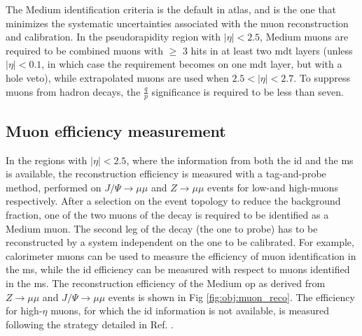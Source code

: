 The Medium identification criteria is the default in \gls{atlas}, and is the one that minimizes the systematic uncertainties associated with 
the muon reconstruction and calibration. In the pseudorapidity region with $|\eta|<2.5$, Medium muons are required to be combined muons with $\geq$ 3 hits in at least two \gls{mdt} layers (unless $|\eta|<0.1$, in which case the requirement becomes on one \gls{mdt} layer, but with a hole veto), while extrapolated muons are used when $2.5<|\eta|<2.7$. To suppress muons from hadron decays, the $\frac{q}{p}$ significance is required to be less than seven. 

\subsection{Muon efficiency measurement}

In the regions with $|\eta|<2.5$, where the information from both the \gls{id} and the \gls{ms} is available, 
the reconstruction efficiency is measured with a tag-and-probe method, performed on $J/\Psi \rightarrow \mu \mu$ and $Z\rightarrow \mu \mu$ events for low-\pt and high-\pt muons respectively. 
After a selection on the event topology to reduce the background fraction, one of the two muons of the decay is required to be identified 
as a Medium muon. The second leg of the decay (the one to probe) has to be reconstructed by a system independent on the one to be calibrated. For example, calorimeter muons can be used to measure the efficiency of muon identification in the \gls{ms}, while the \gls{id} efficiency can be measured with respect to muons identified in the \gls{ms}. 
The reconstruction efficiency of the Medium \gls{op} as derived from $Z\rightarrow \mu \mu$ and $J/\Psi \rightarrow \mu \mu$ events is shown in Fig \ref{fig:obj:muon_reco}.
The efficiency for high-$\eta$ muons, for which the \gls{id} information is not available, is measured following the strategy detailed in Ref. \cite{Aad:2014rra}.


